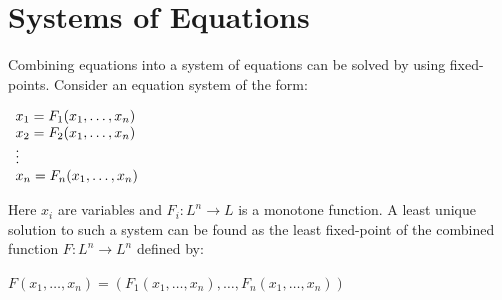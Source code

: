 \section{Systems of Equations}
Combining equations into a system of equations can be solved by using fixed-points.
Consider an equation system of the form:

$
\begin{array}{l c l}
x_1 = F_1(x_1, \dots, x_n) \\
x_2 = F_2(x_1, \dots, x_n)\\
\vdots\\
x_n = F_n(x_1, \dots, x_n)\\
\end{array}
$

Here $x_i$ are variables and $F_i: L^n \rightarrow L$ is a monotone function.
A least unique solution to such a system can be found as the least fixed-point of the combined function $F : L^n \rightarrow L^n$ defined by:

$F(x_1, \dots, x_n) = (F_1(x_1, \dots, x_n), \dots, F_n(x_1, \dots, x_n)) $
